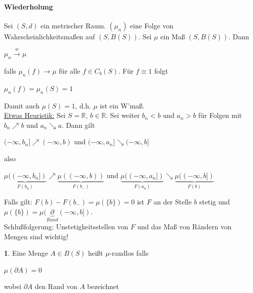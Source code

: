\documentclass[10pt,a4paper]{report}
\newcommand{\R}{\mathbb{R}}
\numberwithin{equation}{section}
\numberwithin{figure}{section}
\theoremstyle{plain}
\theoremstyle{definition}
\newtheorem{defn}[thm]{\protect\definitionname}
\theoremstyle{remark}
\theoremstyle{plain}
\providecommand{\definitionname}{Definition}
\newcommand{\1}{ \mathbb{1} } %
\begin{document}
\paragraph{Wiederholung}
Sei $(S,d)$ ein metrischer Raum. $(\mu_n)$ eine Folge von Wahrscheinlichkeitsmaßen auf $(S,B(S))$. Sei $\mu$ ein Maß $(S,B(S))$. Dann
\begin{center}
  $\mu_n \overset{w}{\to} \mu$
\end{center}
falls $\mu_n(f) \to \mu$ für alle $f \in C_b(S)$. Für $f \equiv 1$ folgt
\begin{center}
  $\mu_n(f)=\mu_n(S)=1$
\end{center}
Damit auch $\mu(S)=1$, d.h. $\mu$ ist ein W'maß.\\
\underline{Etwas Heuristik:} 
Sei $S=\R$, $b \in \R$. Sei weiter $b_n <b$ und $a_n>b$ für Folgen mit $b_n\nearrow b$ und $a_n \searrow a$. Dann gilt
\begin{center}
  $(-\infty,b_n] \nearrow (-\infty,b)$ und $(-\infty,a_n] \searrow (-\infty,b]$
\end{center}
also 
\begin{center}
  $\underbrace{\mu((-\infty,b_n])}_{F(b_n)} \nearrow \underbrace{\mu((-\infty,b))}_{F(b_-)}$ und $\underbrace{\mu((-\infty,a_n])}_{F(a_n)} \searrow \underbrace{\mu((-\infty,b])}_{F(b)}$
\end{center}
Falls gilt: $F(b)-F(b_-)=\mu(\{b\})=0$ ist $F$ an der Stelle $b$ stetig und $\mu(\{b\})=\mu(\underbrace{\partial}_{Rand}(-\infty,b])$.\\
Schlußfolgerung: Unstetigkeitsstellen von $F$ und das Maß von Rändern von Mengen sind wichtig!
\begin{defn}  %
  Eine Menge $A \in B(S)$ heißt $\mu$-randlos falls
  \begin{center}
    $\mu(\partial A)=0$ 
  \end{center}
  wobei $\partial A$ den Rand von $A$ bezeichnet
\end{defn}
\end{document}
